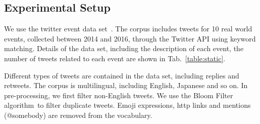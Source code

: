 \documentclass[runningheads]{llncs}
\begin{document}
\subsection{Experimental Setup}
We use the twitter event data set~\cite{ZubiagaTwitterDatasets}. The corpus includes tweets for 10 real world events, collected between 2014 and 2016, through the Twitter API using keyword matching. Details of the data set, including the description of each event, the number of tweets related to each event are shown in Tab.~\ref{table:static}.


Different types of tweets are contained in the data set, including replies and retweets. The corpus is multilingual, including English, Japanese and so on.
In pre-processing, we first filter non-English tweets. We use the Bloom Filter algorithm~\cite{BloomFilter}to filter duplicate tweets. Emoji expressions, http links and mentions (@somebody) are removed from the vocabulary.
\end{document}
